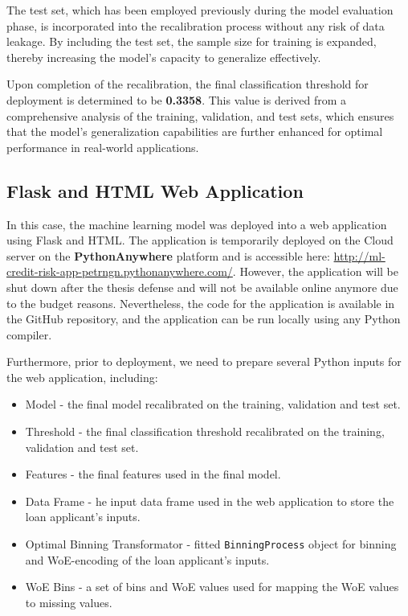         The test set, which has been employed previously during the model evaluation phase, is incorporated into the recalibration process without any risk of data leakage.
        By including the test set, the sample size for training is expanded, thereby increasing the model's capacity to generalize effectively.
        
        Upon completion of the recalibration, the final classification threshold for deployment is determined to be \textbf{0.3358}.
        This value is derived from a comprehensive analysis of the training, validation, and test sets, which ensures that the model's generalization capabilities are further enhanced for optimal performance in real-world applications.
        
        \subsection{Flask and HTML Web Application}
        
        In this case, the machine learning model was deployed into a web application using Flask and HTML. The application is temporarily deployed on the Cloud server on the \textbf{PythonAnywhere} platform and is accessible here: \url{http://ml-credit-risk-app-petrngn.pythonanywhere.com/}.
        However, the application will be shut down after the thesis defense and will not be available online anymore due to the budget reasons.
        Nevertheless, the code for the application is available in the GitHub repository, and the application can be run locally using any Python compiler.
        
        Furthermore, prior to deployment, we need to prepare several Python inputs for the web application, including:
        \begin{itemize}\setlength\itemsep{0em}
            \item Model - the final model recalibrated on the training, validation and test set.
            \item Threshold - the final classification threshold recalibrated on the training, validation and test set.
            \item Features - the final features used in the final model.
            \item Data Frame - he input data frame used in the web application to store the loan applicant's inputs.
            \item Optimal Binning Transformator - fitted \lstinline{BinningProcess} object for binning and WoE-encoding of the loan applicant's inputs.
            \item WoE Bins - a set of bins and WoE values used for mapping the WoE values to missing values.
        \end{itemize}
        
